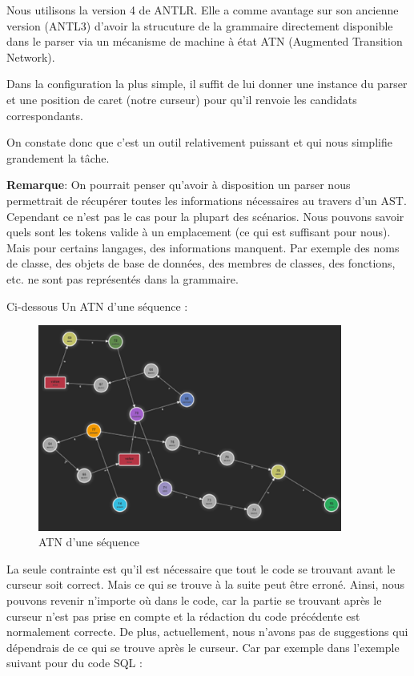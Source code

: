 \documentclass[
    iict, %
    il, %
]{heig-tb}
\begin{document}
Nous utilisons la version 4 de ANTLR. Elle a comme avantage sur son ancienne version (ANTL3) d'avoir la strucuture de la grammaire directement disponible dans le parser via
un mécanisme de machine à état ATN (Augmented Transition Network).

Dans la configuration la plus simple, il suffit de lui donner une instance du parser et une position de caret (notre curseur) pour qu'il renvoie les candidats correspondants.

On constate donc que c'est un outil relativement puissant et qui nous simplifie grandement la tâche.

\textbf{Remarque}: On pourrait penser qu'avoir à disposition un parser nous permettrait de récupérer toutes les informations nécessaires au travers d'un AST. Cependant ce n'est pas le cas pour la plupart des scénarios.
Nous pouvons savoir quels sont les tokens valide à un emplacement (ce qui est suffisant pour nous). Mais pour certains langages, des informations manquent. Par exemple des noms de classe, des objets de base de données, des membres de classes, des fonctions, etc. ne sont pas représentés dans la grammaire. 

Ci-dessous Un ATN d'une séquence :

\begin{figure}[!ht]
    \begin{center}
        \includegraphics[width=10cm]{assets/figures/seq_ATN.png}
    \end{center}
    \caption[ATN d'une séquence]{\label{seq_ATN} ATN d'une séquence}
\end{figure}

La seule contrainte est qu'il est nécessaire que tout le code se trouvant avant le curseur soit correct. Mais ce qui se trouve à la suite peut être erroné. 
Ainsi, nous pouvons revenir n'importe où dans le code, car la partie se trouvant après le curseur n'est pas prise en compte et la rédaction du code précédente est normalement correcte.
De plus, actuellement, nous n'avons pas de suggestions qui dépendrais de ce qui se trouve après le curseur.
Car par exemple dans l'exemple suivant pour du code SQL :
\end{document}
